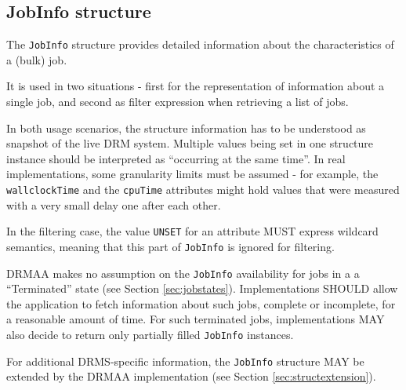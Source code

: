 \documentclass{article}
\newcommand{\h}[1]{\lstinline|#1|}
\newcommand{\rat}[1]{}
\begin{document}
\subsection{JobInfo structure}
\label{sec:jobinfo}

The \h{JobInfo} structure provides detailed information about the characteristics of a (bulk) job.



It is used in two situations - first for the representation of information about a single job, and second as filter expression when retrieving a list of jobs.

In both usage scenarios, the structure information has to be understood as snapshot of the live DRM system. Multiple values being set in one structure instance should be interpreted as \enquote{occurring at the same time}. In real implementations, some granularity limits must be assumed - for example, the \h{wallclockTime} and the \h{cpuTime} attributes might hold values that were measured with a very small delay one after each other.

In the filtering case, the value \h{UNSET} for an attribute MUST express wildcard semantics, meaning that this part of \h{JobInfo} is ignored for filtering.

DRMAA makes no assumption on the \h{JobInfo} availability for jobs in a a \enquote{Terminated} state (see Section \ref{sec:jobstates}). Implementations SHOULD allow the application to fetch information about such jobs, complete or incomplete, for a reasonable amount of time. For such terminated jobs, implementations MAY also decide to return only partially filled \h{JobInfo} instances.

\rat{We want to tackle performance restrictions in the communication with the DRM system by this.}

For additional DRMS-specific information, the \h{JobInfo} structure MAY be extended by the DRMAA implementation (see Section \ref{sec:structextension}).

\rat{
In comparison to DRMAA 1.0, the JobInfo value type was heavily extended for providing more information (solves issue \#2827). JobInfo::hasCoreDump is no longer supported, since the information is useless without according core file staging support, which is not implementable in a portable way. (conf. call Jun 9th 2010) resourceUsage is no longer supported, since this should be modeled with implementation-specific attributes (conf call Apr 13th 2011).

Some DRM systems (SGE / Condor at least) support the automated modification of job template attributes after submission, and therefore allow to fetch the true job template attributes at run-time from the job. The monitoring for such data was intentionally not included in DRMAA (mailing list July 2010).

A comment attribute was rejected (conf call May 11th).

Several conf. calls in 2011 ended up in the conclusion that data reaping cannot be clarified by DRMAA. There are too many completely different use cases in local and distributed systems.
}
\end{document}
